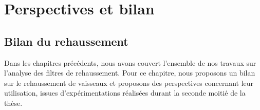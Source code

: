 \chapter{Perspectives et bilan}
\label{sec:Ending}

\section{Bilan du rehaussement}

Dans les chapitres précédents, nous avons couvert l'ensemble de nos travaux sur l'analyse des filtres de rehaussement. Pour ce chapitre, nous proposons un bilan sur le rehaussement de vaisseaux et proposons des perspectives concernant leur utilisation, issues d'expérimentations réalisées durant la seconde moitié de la thèse. 




